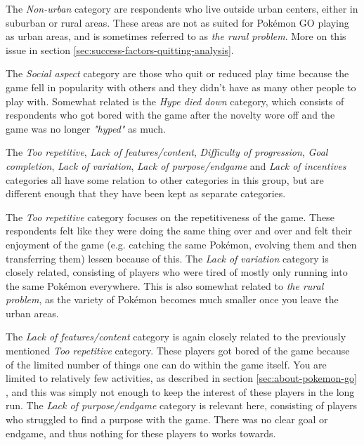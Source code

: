 The \emph{Non-urban} category are respondents who live outside urban centers, either in suburban or rural areas. These areas are not as suited for Pokémon GO playing as urban areas, and is sometimes referred to as \emph{the rural problem}. More on this issue in section \ref{sec:success-factors-quitting-analysis}.

The \emph{Social aspect} category are those who quit or reduced play time because the game fell in popularity with others and they didn't have as many other people to play with. Somewhat related is the \emph{Hype died down} category, which consists of respondents who got bored with the game after the novelty wore off and the game was no longer \emph{"hyped"} as much.

The \emph{Too repetitive}, \emph{Lack of features/content}, \emph{Difficulty of progression}, \emph{Goal completion}, \emph{Lack of variation}, \emph{Lack of purpose/endgame} and \emph{Lack of incentives} categories all have some relation to other categories in this group, but are different enough that they have been kept as separate categories. 

The \emph{Too repetitive} category focuses on the repetitiveness of the game. These respondents felt like they were doing the same thing over and over and felt their enjoyment of the game (e.g. catching the same Pokémon, evolving them and then transferring them) lessen because of this. The \emph{Lack of variation} category is closely related, consisting of players who were tired of mostly only running into the same Pokémon everywhere. This is also somewhat related to \emph{the rural problem}, as the variety of Pokémon becomes much smaller once you leave the urban areas.

The \emph{Lack of features/content} category is again closely related to the previously mentioned \emph{Too repetitive} category. These players got bored of the game because of the limited number of things one can do within the game itself. You are limited to relatively few activities, as described in section \ref{sec:about-pokemon-go} , and this was simply not enough to keep the interest of these players in the long run. The \emph{Lack of purpose/endgame} category is relevant here, consisting of players who struggled to find a purpose with the game. There was no clear goal or endgame, and thus nothing for these players to works towards.

